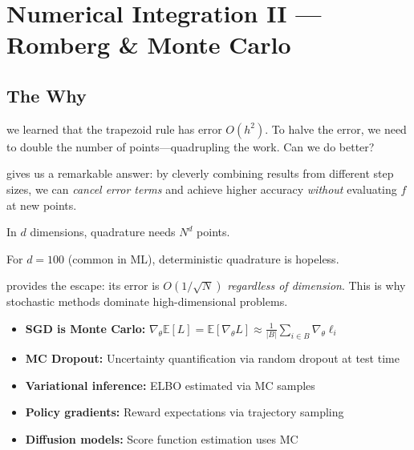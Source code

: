 \chapter{Numerical Integration II --- Romberg \& Monte Carlo}



\section{The Why}

 we learned that the trapezoid rule has error $O(h^2)$.
To halve the error, we need to double the number of points---quadrupling the work.
Can we do better?

 gives us a remarkable answer: by cleverly combining results from different step sizes, we can \emph{cancel error terms} and achieve higher accuracy \emph{without} evaluating $f$ at new points.

 In $d$ dimensions, quadrature needs $N^d$ points.


For $d = 100$ (common in ML), deterministic quadrature is hopeless.

 provides the escape: its error is $O(1/\sqrt{N})$ \emph{regardless of dimension}. This is why stochastic methods dominate high-dimensional problems.

\begin{itemize}
    \item \textbf{SGD is Monte Carlo:} $\nabla_\theta \mathbb{E}[L] = \mathbb{E}[\nabla_\theta L] \approx \frac{1}{|B|}\sum_{i \in B} \nabla_\theta \ell_i$
    \item \textbf{MC Dropout:} Uncertainty quantification via random dropout at test time
    \item \textbf{Variational inference:} ELBO estimated via MC samples
    \item \textbf{Policy gradients:} Reward expectations via trajectory sampling
    \item \textbf{Diffusion models:} Score function estimation uses MC
\end{itemize}

